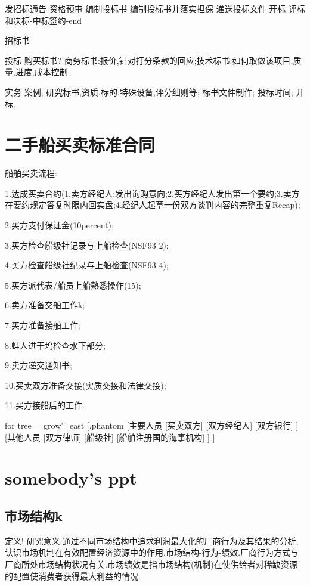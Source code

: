 \documentclass[UTF8,a4paper]{ctexart}
\begin{document}
		发招标通告-资格预审-编制投标书-编制投标书并落实担保-递送投标文件-开标-评标和决标-中标签约-end
		
		招标书
		
		投标 购买标书? 商务标书:报价,针对打分条款的回应;技术标书:如何取做该项目,质量,进度,成本控制.
		
		实务 案例; 研究标书,资质,标的,特殊设备,评分细则等; 标书文件制作; 投标时间; 开标.
		
	\section{二手船买卖标准合同}
		船舶买卖流程:
		
		1.达成买卖合约(1.卖方经纪人:发出询购意向;2.买方经纪人发出第一个要约;3.卖方在要约规定答复时限内回实盘;4.经纪人起草一份双方谈判内容的完整重复Recap); 
		
		2.买方支付保证金(10percent);
		
		3.买方检查船级社记录与上船检查(NSF93 2); 
		
		4.买方检查船级社纪录与上船检查(NSF93 4); 
		
		5.买方派代表/船员上船熟悉操作(15);
		
		6.卖方准备交船工作k;
		
		7.买方准备接船工作;
		
		8.蛙人进干坞检查水下部分;
		
		9.卖方递交通知书;
		
		10.买卖双方准备交接(实质交接和法律交接);
		
		11.买方接船后的工作.
		\begin{forest}
			for tree = {grow'=east}
			[,phantom
				[主要人员
					[买卖双方]
					[双方经纪人]
					[双方银行]
					]
				[其他人员
					[双方律师]
					[船级社]
					[船舶注册国的海事机构]
					]
				]
		\end{forest}
	
	\section{somebody's ppt}
		\subsection{市场结构k}
			定义!
			研究意义:通过不同市场结构中追求利润最大化的厂商行为及其结果的分析,认识市场机制在有效配置经济资源中的作用.市场结构-行为-绩效.厂商行为方式与厂商所处市场结构状况有关.市场绩效是指市场结构(机制)在使供给者对稀缺资源的配置使消费者获得最大利益的情况.
			
\end{document}
